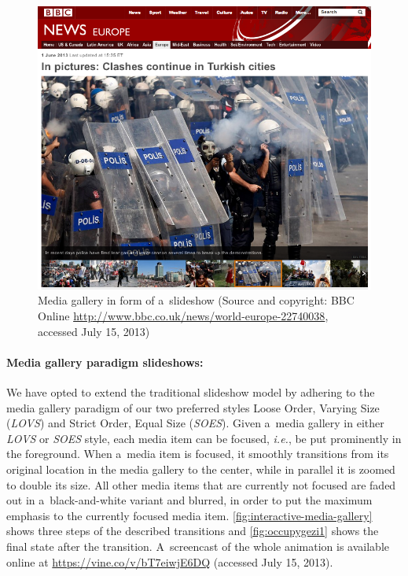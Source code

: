 \begin{figure}[!ht]
  \centering
  \includegraphics[width=0.8\columnwidth]{occupygezibbc.png}
  \caption[Media gallery in form of a~slideshow]{Media gallery in form of a~slideshow
  (Source and copyright: BBC Online \url{http://www.bbc.co.uk/news/world-europe-22740038}, accessed July 15, 2013)}
  \label{fig:occupygezibbc}
\end{figure}

\paragraph{Media gallery paradigm slideshows:}

We have opted to extend the traditional slideshow model
by adhering to the media gallery paradigm of our two preferred styles
Loose Order, Varying Size (\emph{LOVS}) and Strict Order, Equal Size (\emph{SOES}).
Given a~media gallery in either \emph{LOVS} or \emph{SOES} style,
each media item can be focused,
\emph{i.e.}, be put prominently in the foreground.
When a~media item is focused, it smoothly transitions
from its original location in the media gallery to the center,
while in parallel it is zoomed to double its size.
All other media items that are currently not focused are faded out
in a~black-and-white variant and blurred, in order to put the maximum emphasis
to the currently focused media item.
\autoref{fig:interactive-media-gallery} shows three steps of the described transitions and
\autoref{fig:occupygezi1} shows the final state after the transition.
A~screencast of the whole animation is available online at \url{https://vine.co/v/bT7eiwjE6DQ} (accessed July 15, 2013).

